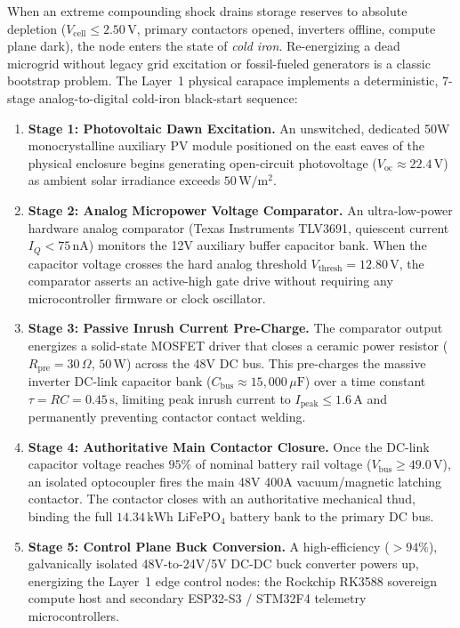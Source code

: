 When an extreme compounding shock drains storage reserves to absolute depletion ($V_{\mathrm{cell}} \le 2.50\,\mathrm{V}$, primary contactors opened, inverters offline, compute plane dark), the node enters the state of \textit{cold iron}. Re-energizing a dead microgrid without legacy grid excitation or fossil-fueled generators is a classic bootstrap problem. The Layer~1 physical carapace implements a deterministic, 7-stage analog-to-digital cold-iron black-start sequence:

\begin{enumerate}
    \item \textbf{Stage 1: Photovoltaic Dawn Excitation.} An unswitched, dedicated 50W monocrystalline auxiliary PV module positioned on the east eaves of the physical enclosure begins generating open-circuit photovoltage ($V_{\mathrm{oc}} \approx 22.4\,\mathrm{V}$) as ambient solar irradiance exceeds $50\,\mathrm{W/m^2}$.
    \item \textbf{Stage 2: Analog Micropower Voltage Comparator.} An ultra-low-power hardware analog comparator (Texas Instruments TLV3691, quiescent current $I_Q < 75\,\mathrm{nA}$) monitors the 12V auxiliary buffer capacitor bank. When the capacitor voltage crosses the hard analog threshold $V_{\mathrm{thresh}} = 12.80\,\mathrm{V}$, the comparator asserts an active-high gate drive without requiring any microcontroller firmware or clock oscillator.
    \item \textbf{Stage 3: Passive Inrush Current Pre-Charge.} The comparator output energizes a solid-state MOSFET driver that closes a ceramic power resistor ($R_{\mathrm{pre}} = 30\,\Omega$, $50\,\mathrm{W}$) across the 48V DC bus. This pre-charges the massive inverter DC-link capacitor bank ($C_{\mathrm{bus}} \approx 15{,}000\,\mu\mathrm{F}$) over a time constant $\tau = R C = 0.45\,\mathrm{s}$, limiting peak inrush current to $I_{\mathrm{peak}} \le 1.6\,\mathrm{A}$ and permanently preventing contactor contact welding.
    \item \textbf{Stage 4: Authoritative Main Contactor Closure.} Once the DC-link capacitor voltage reaches $95\%$ of nominal battery rail voltage ($V_{\mathrm{bus}} \ge 49.0\,\mathrm{V}$), an isolated optocoupler fires the main 48V 400A vacuum/magnetic latching contactor. The contactor closes with an authoritative mechanical thud, binding the full $14.34\,\mathrm{kWh}$ $\mathrm{LiFePO}_4$ battery bank to the primary DC bus.
    \item \textbf{Stage 5: Control Plane Buck Conversion.} A high-efficiency ($>94\%$), galvanically isolated 48V-to-24V/5V DC-DC buck converter powers up, energizing the Layer~1 edge control nodes: the Rockchip RK3588 sovereign compute host and secondary ESP32-S3 / STM32F4 telemetry microcontrollers.

\end{enumerate}
